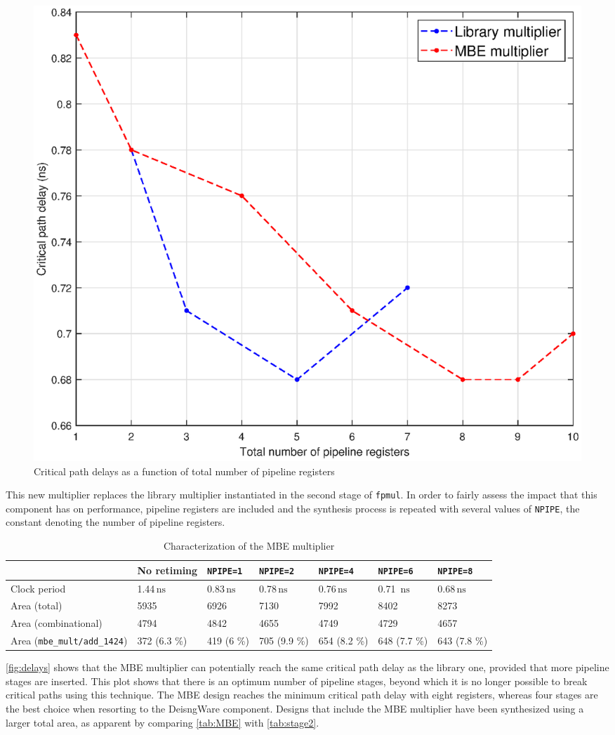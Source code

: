 \begin{figure}
	\includegraphics[width=\textwidth]{chapter2/images/delays.eps}
	\caption{Critical path delays as a function of total number of pipeline registers}
	\label{fig:delays}
\end{figure}
This new multiplier replaces the library multiplier instantiated in the second stage of \texttt{fpmul}. In order to fairly assess the impact that this component has on performance, pipeline registers are included and the synthesis process is repeated with several values of \texttt{NPIPE}, the constant denoting the number of pipeline registers.
\begin{table}
\begin{tabular}{|l|l|l|l|l|l|l|}\hline
	& No retiming & \texttt{NPIPE=1} & \texttt{NPIPE=2} & \texttt{NPIPE=4} & \texttt{NPIPE=6} & \texttt{NPIPE=8}\\\hline
	Clock period & 1.44$\,\textrm{ns}$ & 0.83$\,\textrm{ns}$& 0.78$\,\textrm{ns}$& 0.76$\,\textrm{ns}$ & 0.71 $\,\textrm{ns}$& 0.68$\,\textrm{ns}$ \\\hline
	Area (total) & 5935 & 6926 & 7130 & 7992 & 8402 & 8273 \\\hline
	Area (combinational) & 4794 & 4842 & 4655 & 4749 & 4729 & 4657 \\\hline
	Area (\texttt{mbe\_mult/add\_1424}) & 372 (6.3 \%)  & 419 (6 \%)  &  705 (9.9 \%)& 654 (8.2 \%) & 648 (7.7 \%) & 643 (7.8 \%)\\\hline
\end{tabular}
\caption{Characterization of the MBE multiplier}
\label{tab:MBE}
\end{table}
\autoref{fig:delays} shows that the MBE multiplier can potentially reach the same critical path delay as the library one, provided that more pipeline stages are inserted. This plot shows that there is an optimum number of pipeline stages, beyond which it is no longer possible to break critical paths using this technique. The MBE design reaches the minimum critical path delay with eight registers, whereas four stages are the best choice when resorting to the DeisngWare component. Designs that include the MBE multiplier have been synthesized using a larger total area, as apparent by comparing \autoref{tab:MBE} with \autoref{tab:stage2}.
